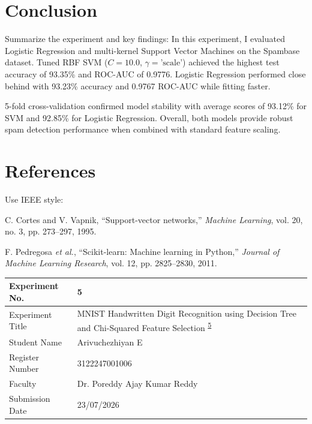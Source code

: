 \documentclass[12pt,a4paper]{article}
\begin{document}
\section{Conclusion}
Summarize the experiment and key findings:
In this experiment, I evaluated Logistic Regression and multi-kernel Support Vector Machines on the Spambase dataset. Tuned RBF SVM ($C=10.0$, $\gamma=\text{'scale'}$) achieved the highest test accuracy of 93.35\% and ROC-AUC of 0.9776. Logistic Regression performed close behind with 93.23\% accuracy and 0.9767 ROC-AUC while fitting faster. 

5-fold cross-validation confirmed model stability with average scores of 93.12\% for SVM and 92.85\% for Logistic Regression. Overall, both models provide robust spam detection performance when combined with standard feature scaling.

\section{References}
Use IEEE style:
\begin{enumerate}[label={[\arabic*]}]
\item C. Cortes and V. Vapnik, ``Support-vector networks,'' \textit{Machine Learning}, vol. 20, no. 3, pp. 273--297, 1995.
\item F. Pedregosa \textit{et al.}, ``Scikit-learn: Machine learning in Python,'' \textit{Journal of Machine Learning Research}, vol. 12, pp. 2825--2830, 2011.
\end{enumerate}

\newpage


\begin{tabular}{|p{4cm}|p{11cm}|}
\hline
Experiment No. & 5 \\ \hline
Experiment Title & MNIST Handwritten Digit Recognition using Decision Tree and Chi-Squared Feature Selection \textsuperscript{\href{https://github.com/arivuchezhiyan/Machine_Learning}{5}} \\ \hline
Student Name & Arivuchezhiyan E \\ \hline
Register Number & 3122247001006 \\ \hline
Faculty & Dr. Poreddy Ajay Kumar Reddy \\ \hline
Submission Date & 23/07/2026 \\ \hline
\end{tabular}
\end{document}

